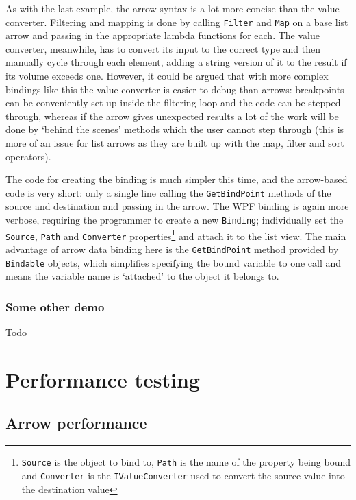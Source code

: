 \documentclass[12pt,twoside,notitlepage]{report}
\begin{document}
As with the last example, the arrow syntax is a lot more concise than the value converter. Filtering and mapping is done by calling \texttt{Filter} and \texttt{Map} on a base list arrow and passing in the appropriate lambda functions for each. The value converter, meanwhile, has to convert its input to the correct type and then manually cycle through each element, adding a string version of it to the result if its volume exceeds one. However, it could be argued that with more complex bindings like this the value converter is easier to debug than arrows: breakpoints can be conveniently set up inside the filtering loop and the code can be stepped through, whereas if the arrow gives unexpected results a lot of the work will be done by `behind the scenes' methods which the user cannot step through (this is more of an issue for list arrows as they are built up with the map, filter and sort operators).

The code for creating the binding is much simpler this time, and the arrow-based code is very short: only a single line calling the \texttt{GetBindPoint} methods of the source and destination and passing in the arrow. The WPF binding is again more verbose, requiring the programmer to create a new \texttt{Binding}; individually set the \texttt{Source}, \texttt{Path} and \texttt{Converter} properties\footnote{\texttt{Source} is the object to bind to, \texttt{Path} is the name of the property being bound and \texttt{Converter} is the \texttt{IValueConverter} used to convert the source value into the destination value} and attach it to the list view. The main advantage of arrow data binding here is the \texttt{GetBindPoint} method provided by \texttt{Bindable} objects, which simplifies specifying the bound variable to one call and means the variable name is `attached' to the object it belongs to.

\subsubsection{Some other demo}

Todo

\section{Performance testing}

\subsection{Arrow performance}
\end{document}

